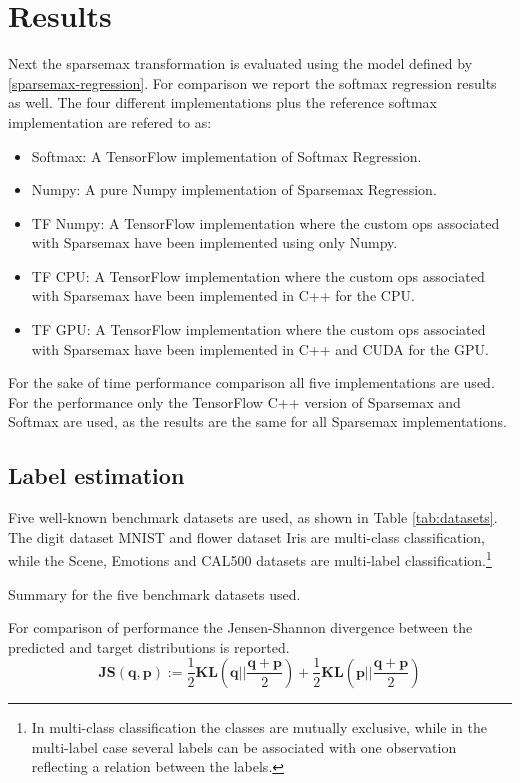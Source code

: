 \section{Results}
Next the sparsemax transformation is evaluated using the model defined by \eqref{sparsemax-regression}. For comparison we report the softmax regression results as well. The four different implementations plus the reference softmax implementation are refered to as:
\begin{itemize}
\setlength\itemsep{-0.3em}
\item Softmax: A TensorFlow implementation of Softmax Regression.
\item Numpy: A pure Numpy implementation of Sparsemax Regression.
\item TF Numpy: A TensorFlow implementation where the custom ops associated with Sparsemax have been implemented using only Numpy.
\item TF CPU: A TensorFlow implementation where the custom ops associated with Sparsemax have been implemented in C++ for the CPU.
\item TF GPU: A TensorFlow implementation where the custom ops associated with Sparsemax have been implemented in C++ and CUDA for the GPU.
\end{itemize}
For the sake of time performance comparison all five implementations are used. For the performance only the TensorFlow C++ version of Sparsemax and Softmax are used, as the results are the same for all Sparsemax implementations.

\subsection{Label estimation}
Five well-known benchmark datasets are used, as shown in Table \ref{tab:datasets}. The digit dataset MNIST and flower dataset Iris are multi-class classification, while the Scene, Emotions and CAL500 datasets are multi-label classification.\footnote{In multi-class classification the classes are mutually exclusive, while in the multi-label case several labels can be associated with one observation reflecting a relation between the labels.} 
\begin{table}[H]
\centering

\caption{Summary for the five benchmark datasets used.}
\label{tab:datasets}
\end{table}
For comparison of performance the Jensen-Shannon divergence between the predicted and target distributions is reported.
\begin{equation*}
\mathbf{JS(q,p)}:=\frac{1}{2}\mathbf{KL}\left(\mathbf{q}\Big|\Big|\frac{\mathbf{q}+\mathbf{p}}{2}\right)+\frac{1}{2}\mathbf{KL}\left(\mathbf{p}\Big|\Big|\frac{\mathbf{q}+\mathbf{p}}{2}\right)
\end{equation*}

